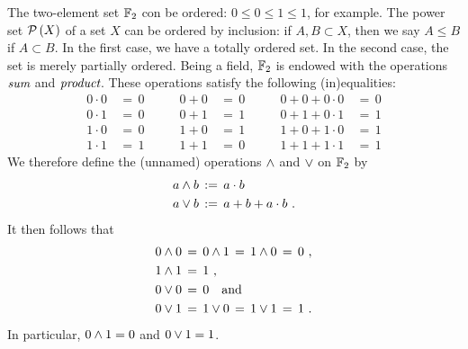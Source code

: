 

The two-element set $\mathbb{F}_{2}$ con be ordered:
$0\leq 0\leq 1\leq 1$, for example. The power set $\mathcal{P}\left(X\right)$ of a set
$X$ can be ordered by inclusion: if $A,B\subset X$, then we say $A\leq B$ if
$A\subset B$. In the first case, we have a totally ordered set. In the second
case, the set is merely partially ordered. Being a field, $\mathbb{F}_{2}$ is
endowed with the operations $\emph{sum}$ and $\emph{product}$. These
operations satisfy the following (in)equalities:
% 
\begin{align*}
	0\cdot 0 & \,=\, 0 \qquad & 0 + 0 & \,=\, 0 \qquad &
		0 + 0 + 0\cdot 0 & \,=\, 0 \\
	0\cdot 1 & \,=\, 0 \qquad & 0 + 1 & \,=\, 1 \qquad &
		0 + 1 +0\cdot 1 & \,=\, 1 \\
	1\cdot 0 & \,=\, 0 \qquad & 1 + 0 & \,=\, 1 \qquad &
		1 + 0 + 1\cdot 0 & \,=\, 1 \\
	1\cdot 1 & \,=\, 1 \qquad & 1 + 1 & \,=\, 0 \qquad &
		1 + 1 + 1\cdot 1 & \,=\, 1 
\end{align*}
%
We therefore define the (unnamed) operations $\wedge$ and $\vee$ on
$\mathbb{F}_{2}$ by
\begin{align*}
	a\wedge b & \,:=\, a\cdot b \\
	a\vee b & \,:=\, a + b + a\cdot b
	\text{ .}
\end{align*}
%
It then follows that
\begin{align*}
	0\wedge 0 & \,=\, 0\wedge 1 \,=\, 1\wedge 0 \,=\, 0
		\text{ ,} \\
	1\wedge 1 & \,=\, 1 \text{ ,} \\
	0\vee 0 & \,=\, 0 \quad\text{and} \\
	0\vee 1 & \,=\, 1\vee 0 \,=\, 1\vee 1 \,=\, 1
		\text{ .}
\end{align*}
%
In particular, $0\wedge 1=0$ and $0\vee 1=1$.

